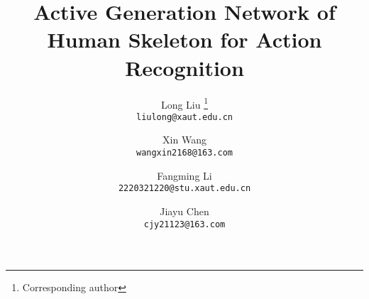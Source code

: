 \documentclass[10pt,twocolumn,letterpaper]{article}
\title{
Active Generation Network of Human Skeleton for Action Recognition
}
\author{Long Liu \footnote{Corresponding author}\\
{\tt\small liulong@xaut.edu.cn}
\and
Xin Wang\\
{\tt\small wangxin2168@163.com}
\and
Fangming Li\\
{\tt\small 2220321220@stu.xaut.edu.cn}
\and
Jiayu Chen\\
{\tt\small cjy21123@163.com}
}
\begin{document}
\maketitle
    





{
    \small
    
    
}
\end{document}
